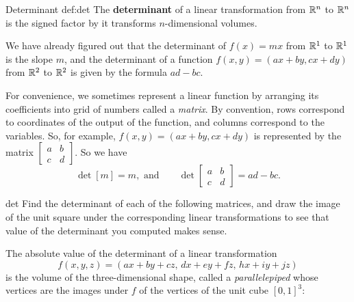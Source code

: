 \documentclass[svgnames]{report}
\begin{document}
\begin{defn}{Determinant }{def:det} \bang{-5mm}
  The \textbf{determinant} of a linear transformation from $\mathbb{R}^n$ to
  $\mathbb{R}^n$ is the signed factor by it transforms $n$-dimensional
  volumes. 
\end{defn}

We have already figured out that the determinant of $f(x) = mx$ from
$\mathbb{R}^1$ to $\mathbb{R}^1$ is the slope $m$, and the determinant of a function
$f(x,y) = (ax + by, cx + dy)$ from $\mathbb{R}^2$ to $\mathbb{R}^2$ is given by the
formula $ad - bc$.

For convenience, we sometimes represent a linear function by arranging
its coefficients into grid of numbers called a \textit{matrix}. By
convention, rows correspond to coordinates of the output of the
function, and columns correspond to the variables. So, for example,
$f(x,y) = (ax + by, cx + dy)$ is represented by the matrix
$\left[\begin{array}{cc} a & b \\ c & d \end{array}\right]$. So we
have
\[
\det [m] = m, \text{ and} \qquad \det \left[\begin{array}{cc} a & b \\ c & d \end{array}\right] = ad - bc. 
\]

\begin{exercise}{}{det}
  Find the determinant of each of the following matrices, and draw the image of the unit square under the corresponding linear transformations to see that value of the determinant you computed makes sense. 

\pairofprobs{$\left[\begin{array}{cc} 1 & 0 \\ 0 & -1 \end{array}\right]$}{
$\left[\begin{array}{cc} 2 & 1 \\ 0 & 2 \end{array}\right]$}

\pairofprobs{$\left[\begin{array}{cc} 0 & 1 \\ -1 & 0 \end{array}\right]$}{
$\left[\begin{array}{cc} 2 & 1  \\ 4 & 2 \end{array}\right]$}
\end{exercise}

The absolute value of the determinant of a linear transformation 
\[
f(x,y,z) = (ax + by + cz, \, dx + ey + fz,\, hx + iy  + jz)
\]
is the volume of the three-dimensional shape, called a
\textit{parallelepiped} whose vertices are the images under $f$ of the
vertices of the unit cube $[0,1]^3$:
\end{document}
